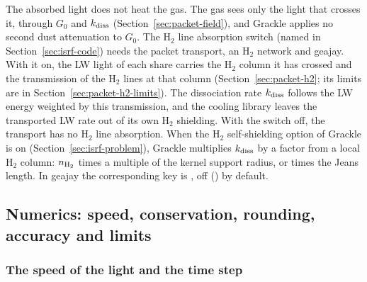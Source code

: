The absorbed light does not heat the gas. The gas sees only the light that
crosses it, through $G_0$ and $k_{\rm diss}$ (Section~\ref{sec:packet-field}),
and Grackle applies no second dust attenuation to $G_0$. The H$_2$ line
absorption switch (named in Section~\ref{sec:isrf-code}) needs the packet
transport, an H$_2$ network and geajay. With it on, the LW light of each share carries the H$_2$ column it
has crossed and the transmission of the H$_2$ lines at that column
(Section~\ref{sec:packet-h2}; its limits are in
Section~\ref{sec:packet-h2-limits}). The dissociation rate $k_{\rm diss}$ follows
the LW energy weighted by this transmission, and the cooling library leaves the
transported LW rate out of its own H$_2$ shielding. With the switch off, the
transport has no H$_2$ line absorption. When the H$_2$ self-shielding option of Grackle is on
(Section~\ref{sec:isrf-problem}), Grackle multiplies $k_{\rm diss}$ by a
factor \citep{WolcottGreenHaiman2019} from a local H$_2$ column: $n_{\rm H_2}$
times a multiple of the kernel support radius, or times the Jeans length. In
geajay the corresponding key is ,
off () by default.

\subsection{Numerics: speed, conservation, rounding, accuracy and limits}
\label{sec:isrf-numerics}

\subsubsection{The speed of the light and the time step}
\label{sec:isrf-speed}

